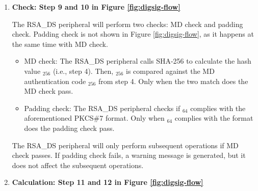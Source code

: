 \documentclass[main\_\_EN.tex]{subfiles}
\begin{document}
\begin{enumerate}
    \item {\bfseries Check: Step 9 and 10 in Figure \ref{fig:digsig-flow}}
        
        The RSA\_DS peripheral will perform two checks: MD check and padding check. Padding check is not shown in Figure \ref{fig:digsig-flow}, as it happens at the same time with MD check. 
        
        \begin{itemize}
    
            \item MD check: The RSA\_DS peripheral calls SHA-256 to calculate the hash value \begin{math}[CALC\_MD]_{256}\end{math} (i.e., step 4). Then, \begin{math}[CALC\_MD]_{256}\end{math} is compared against the MD authentication code \begin{math}[MD]_{256}\end{math} from step 4. Only when the two match does the MD check pass.
            
            \item Padding check: The RSA\_DS peripheral checks if \begin{math}[\beta]_{64} \end{math} complies with the aforementioned PKCS\#7 format. Only when \begin{math}[\beta]_{64} \end{math} complies with the format does the padding check pass.
                    
        \end{itemize}
        
        The RSA\_DS peripheral will only perform subsequent operations if MD check passes. If padding check fails, a warning message is generated, but it does not affect the subsequent operations.
    
    \item {\bfseries Calculation: Step 11 and 12 in Figure \ref{fig:digsig-flow}}
    

\end{enumerate}
\end{document}
